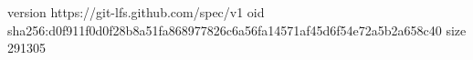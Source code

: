 version https://git-lfs.github.com/spec/v1
oid sha256:d0f911f0d0f28b8a51fa868977826c6a56fa14571af45d6f54e72a5b2a658c40
size 291305
